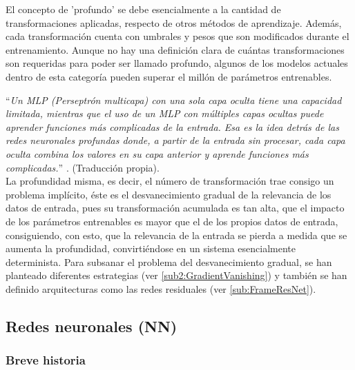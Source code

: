         El concepto de 'profundo' se debe esencialmente a la cantidad de transformaciones aplicadas, respecto de otros métodos de aprendizaje. Además, cada transformación cuenta con umbrales y pesos que son modificados durante el entrenamiento. Aunque no hay una definición clara de cuántas transformaciones son requeridas para poder ser llamado profundo, algunos de los modelos actuales dentro de esta categoría pueden superar el millón de parámetros entrenables.
        
        ``\textit{Un MLP (Perseptrón multicapa) con una sola capa oculta tiene una capacidad limitada, mientras que el uso de un MLP con múltiples capas ocultas puede aprender funciones más complicadas de la entrada. Esa es la idea detrás de las redes neuronales profundas donde, a partir de la entrada sin procesar, cada capa oculta combina los valores en su capa anterior y aprende funciones más complicadas.}'' \cite[Pág 307]{alpaydin2014ML}. (Traducción propia).\\
        
        La profundidad misma, es decir, el número de transformación trae consigo un problema implícito, éste es el desvanecimiento gradual de la relevancia de los datos de entrada, pues su transformación acumulada es tan alta, que el impacto de los parámetros entrenables es mayor que el de los propios datos de entrada, consiguiendo, con esto, que la relevancia de la entrada se pierda a medida que se aumenta la profundidad, convirtiéndose en un sistema esencialmente determinista. Para subsanar el problema del desvanecimiento gradual, se han planteado diferentes estrategias (ver \ref{sub2:GradientVanishing}) y también se han definido arquitecturas como las redes residuales \cite{Kaiming2015} (ver \ref{sub:FrameResNet}).
        
    \subsection{Redes neuronales (NN)}
    \label{sub:FrameNeuralNetworks}
    
        \subsubsection{Breve historia}
        \label{sub2:History}
 		
